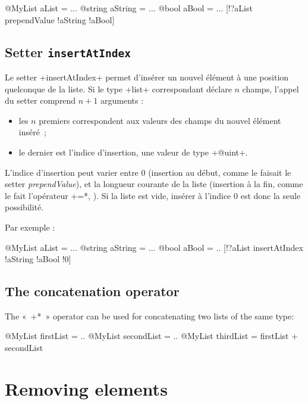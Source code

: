 \begin{galgas}
@MyList aList = ...
@string aString = ...
@bool aBool = ...
[!?aList prependValue !aString !aBool]
\end{galgas}




\subsection{Setter \texttt{insertAtIndex}}

Le setter \ggs+insertAtIndex+ permet d'insérer un nouvel élément à une position quelconque de la liste. Si le type \ggs+list+ correspondant déclare $n$ champs, l'appel du setter comprend $n+1$ arguments :
\begin{itemize}
  \item les $n$ premiers correspondent aux valeurs des champs du nouvel élément inséré~;
  \item le dernier est l'indice d'insertion, une valeur de type \ggs+@uint+.
\end{itemize}

L'indice d'insertion peut varier entre $0$ (insertion au début, comme le faisait le setter \emph{prependValue}), et la longueur courante de la liste (insertion à la fin, comme le fait l'opérateur \ggs*+=*, ). Si la liste est vide, insérer à l'indice $0$ est donc la seule possibilité.

Par exemple :

\begin{galgas}
@MyList aList = ...
@string aString = ...
@bool aBool = ..
[!?aList insertAtIndex !aString !aBool !0]
\end{galgas}

\subsection{The concatenation operator}

The «~\ggs*+*~» operator can be used for concatenating two lists of the same type:


\begin{galgas}
@MyList firstList = ..
@MyList secondList = ..
@MyList thirdList = firstList + secondList
\end{galgas}

\section{Removing elements}

